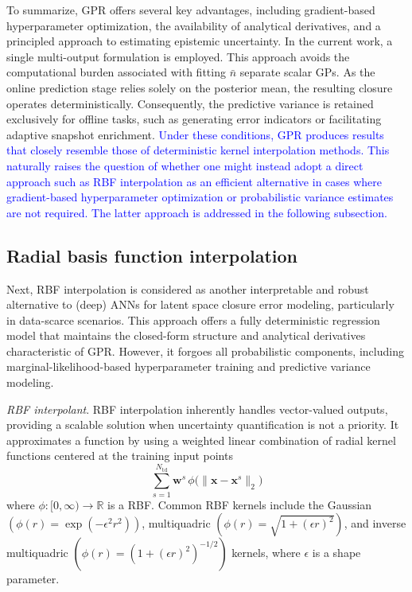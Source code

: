 \documentclass[preprint,10pt]{elsarticle}
\begin{document}
To summarize, GPR offers several key advantages, including gradient-based hyperparameter optimization, the availability of analytical derivatives, and a principled approach to estimating 
epistemic uncertainty. In the current work, a single multi-output formulation is employed. This approach avoids the computational burden associated with fitting $\bar n$ separate 
scalar GPs. As the online prediction stage relies solely on the posterior mean, the resulting closure operates deterministically. Consequently, the predictive variance is 
retained exclusively for offline tasks, such as generating error indicators or facilitating adaptive snapshot enrichment. \textcolor{blue}{Under these conditions, GPR produces results that closely resemble those of deterministic kernel interpolation methods. This naturally raises the question of whether one might instead adopt a direct approach such as RBF interpolation as an efficient alternative in cases where gradient-based hyperparameter optimization or probabilistic variance estimates are not required. The latter approach is addressed in the following subsection.}

\subsection{Radial basis function interpolation}
\label{subsec:deterministic_gpr_rbf}

Next, RBF interpolation is considered as another interpretable and robust alternative to (deep) ANNs for latent space closure error modeling, particularly in data-scarce scenarios. 
This approach offers a fully deterministic regression model \cite{buhmann2000radial} that maintains the closed-form structure and analytical derivatives characteristic of GPR. 
However, it forgoes all probabilistic components, including marginal-likelihood-based hyperparameter training and predictive variance modeling.

\emph{RBF interpolant}. RBF interpolation inherently handles vector-valued outputs, providing a scalable solution when uncertainty quantification is not a priority. It approximates a 
function by using a weighted linear combination of radial kernel functions centered at the training input points
\begin{equation*}
	\sum_{s=1}^{N_\text{td}} \mathbf{w}^s\, \phi\bigl(\| \mathbf{x} - \mathbf{x}^s \|_2\bigr)
\end{equation*}
where $\phi: [0,\infty) \to \mathbb{R}$ is a RBF. Common RBF kernels include the Gaussian $(\phi(r) = \exp(-\epsilon^2 r^2))$, multiquadric $(\phi(r) = \sqrt{1 + (\epsilon r)^2})$, 
and inverse multiquadric $(\phi(r) = (1 + (\epsilon r)^2)^{-1/2})$ kernels, where $\epsilon$ is a shape parameter.
\end{document}
